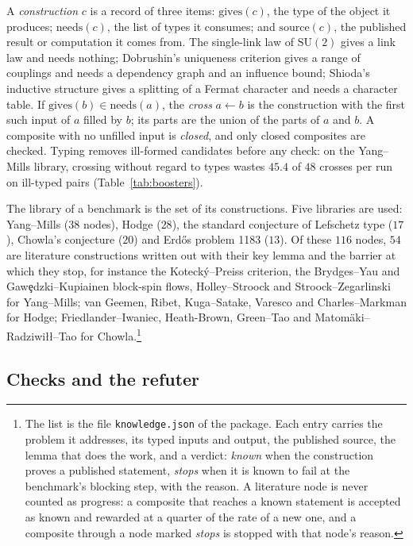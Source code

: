 A \emph{construction} $c$ is a record of three items: $\mathrm{gives}(c)$, the type of the object it produces; $\mathrm{needs}(c)$, the list of types it consumes; and $\mathrm{source}(c)$, the published result or computation it comes from. The single-link law of $\mathrm{SU}(2)$ gives a link law and needs nothing; Dobrushin's uniqueness criterion \cite{Dob68} gives a range of couplings and needs a dependency graph and an influence bound; Shioda's inductive structure \cite{Shi79} gives a splitting of a Fermat character and needs a character table. If $\mathrm{gives}(b)\in\mathrm{needs}(a)$, the \emph{cross} $a\leftarrow b$ is the construction with the first such input of $a$ filled by $b$; its parts are the union of the parts of $a$ and $b$. A composite with no unfilled input is \emph{closed}, and only closed composites are checked. Typing removes ill-formed candidates before any check: on the Yang--Mills library, crossing without regard to types wastes $45.4$ of $48$ crosses per run on ill-typed pairs (Table~\ref{tab:boosters}).

The library of a benchmark is the set of its constructions. Five libraries are used: Yang--Mills ($38$ nodes), Hodge ($28$), the standard conjecture of Lefschetz type ($17$), Chowla's conjecture ($20$) and Erd\H{o}s problem 1183 ($13$). Of these $116$ nodes, $54$ are literature constructions written out with their key lemma and the barrier at which they stop, for instance the Kotecký--Preiss criterion, the Brydges--Yau and Gaw\c{e}dzki--Kupiainen block-spin flows, Holley--Stroock and Stroock--Zegarlinski for Yang--Mills; van Geemen, Ribet, Kuga--Satake, Varesco and Charles--Markman for Hodge; Friedlander--Iwaniec, Heath-Brown, Green--Tao and Matomäki--Radziwi{\l}{\l}--Tao for Chowla.\footnote{The list is the file \texttt{knowledge.json} of the package. Each entry carries the problem it addresses, its typed inputs and output, the published source, the lemma that does the work, and a verdict: \emph{known} when the construction proves a published statement, \emph{stops} when it is known to fail at the benchmark's blocking step, with the reason. A literature node is never counted as progress: a composite that reaches a known statement is accepted as known and rewarded at a quarter of the rate of a new one, and a composite through a node marked \emph{stops} is stopped with that node's reason.}

\subsection{Checks and the refuter}

